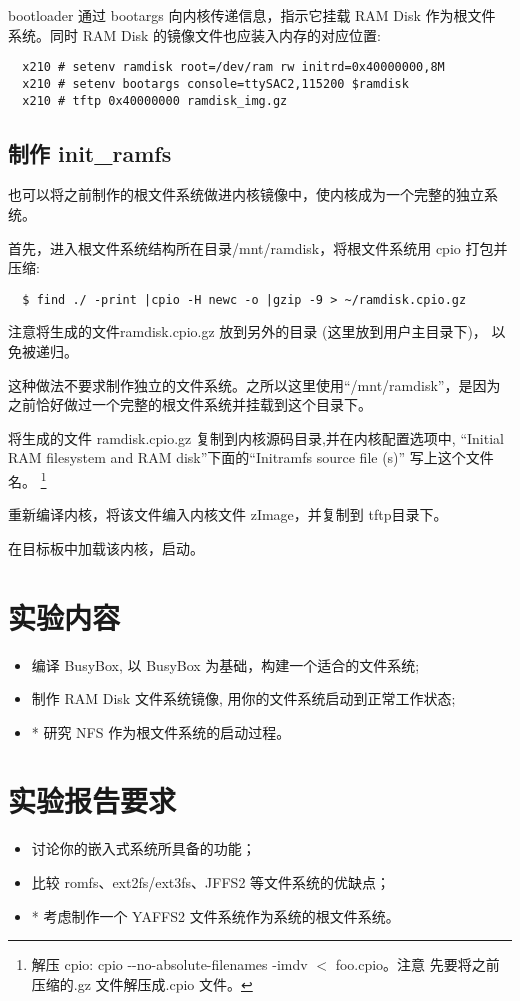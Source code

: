     bootloader 通过 bootargs 向内核传递信息，指示它挂载 RAM Disk 作为根文件
系统。同时 RAM Disk 的镜像文件也应装入内存的对应位置:
\begin{verbatim}
  x210 # setenv ramdisk root=/dev/ram rw initrd=0x40000000,8M
  x210 # setenv bootargs console=ttySAC2,115200 $ramdisk
  x210 # tftp 0x40000000 ramdisk_img.gz
\end{verbatim}

\subsection{制作 init\_ramfs}
也可以将之前制作的根文件系统做进内核镜像中，使内核成为一个完整的独立系统。

首先，进入根文件系统结构所在目录/mnt/ramdisk，将根文件系统用 cpio
打包并压缩:
\begin{verbatim}
  $ find ./ -print |cpio -H newc -o |gzip -9 > ~/ramdisk.cpio.gz
\end{verbatim}

注意将生成的文件ramdisk.cpio.gz 放到另外的目录 (这里放到用户主目录下)，
以免被递归。

这种做法不要求制作独立的文件系统。之所以这里使用``/mnt/ramdisk''，是因为
之前恰好做过一个完整的根文件系统并挂载到这个目录下。

将生成的文件 ramdisk.cpio.gz 复制到内核源码目录,并在内核配置选项中,
``Initial RAM filesystem and RAM disk''下面的``Initramfs source file (s)''
写上这个文件名。
\footnote{解压 cpio: cpio -{}-no-absolute-filenames -imdv $<$ foo.cpio。注意
    先要将之前压缩的.gz 文件解压成.cpio 文件。}

重新编译内核，将该文件编入内核文件 zImage，并复制到 tftp目录下。

在目标板中加载该内核，启动。

\section{实验内容}
\begin{itemize}
  \item 编译 BusyBox, 以 BusyBox 为基础，构建一个适合的文件系统;
  \item 制作 RAM Disk 文件系统镜像, 用你的文件系统启动到正常工作状态;
  \item * 研究 NFS 作为根文件系统的启动过程。
\end{itemize}

\section{实验报告要求}
\begin{itemize}
  \item 讨论你的嵌入式系统所具备的功能；
  \item 比较 romfs、ext2fs/ext3fs、JFFS2 等文件系统的优缺点；
  \item * 考虑制作一个 YAFFS2 文件系统作为系统的根文件系统。
\end{itemize}


